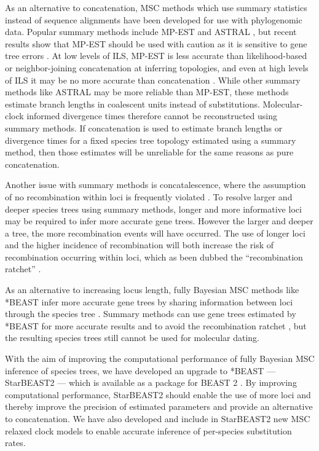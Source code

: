 \documentclass[nogrid]{MBE}%
\begin{document}
As an alternative to concatenation, MSC methods which use summary statistics
instead of sequence alignments have been developed for use with phylogenomic
data. Popular summary methods include MP-EST and ASTRAL \citep{Liu2010,
Mirarab01092014}, but recent results show that MP-EST should be used with
caution as it is sensitive to gene tree errors \citep{Mirarab15062015,
Xi201563}. At low levels of ILS, MP-EST is less accurate than likelihood-based
or neighbor-joining concatenation at inferring topologies, and even at high
levels of ILS it may be no more accurate than concatenation
\citep{Ogilvie01052016}. While other summary methods like ASTRAL may be more
reliable than MP-EST, these methods estimate branch lengths in coalescent
units instead of substitutions. Molecular-clock informed divergence times
therefore cannot be reconstructed using summary methods. If concatenation is
used to estimate branch lengths or divergence times for a fixed species tree
topology estimated using a summary method, then those estimates will be
unreliable for the same reasons as pure concatenation.

Another issue with summary methods is concatalescence, where the assumption of
no recombination within loci is frequently violated \citep{Gatesy26032013}. To
resolve larger and deeper species trees using summary methods, longer and more
informative loci may be required to infer more accurate gene trees. However
the larger and deeper a tree, the more recombination events will have occurred.
The use of longer loci and the higher incidence of recombination will both
increase the risk of recombination occurring within loci, which as been dubbed
the ``recombination ratchet'' \citep{Springer20161}.

As an alternative to increasing locus length, fully Bayesian MSC methods like
*BEAST infer more accurate gene trees by sharing information between loci
through the species tree \citep{Szollosi01012015}. Summary methods can use
gene trees estimated by *BEAST for more accurate results and to avoid the
recombination ratchet \citep{Zimmermann2014}, but the resulting species trees
still cannot be used for molecular dating.

With the aim of improving the computational performance of fully Bayesian MSC
inference of species trees, we have developed an upgrade to *BEAST ---
StarBEAST2 --- which is available as a package for BEAST 2
\citep{10.1371/journal.pcbi.1003537}. By improving computational performance,
StarBEAST2 should enable the use of more loci and thereby improve the
precision of estimated parameters and provide an alternative to concatenation.
We have also developed and include in StarBEAST2 new MSC relaxed clock models
to enable accurate inference of per-species substitution rates.
\end{document}
